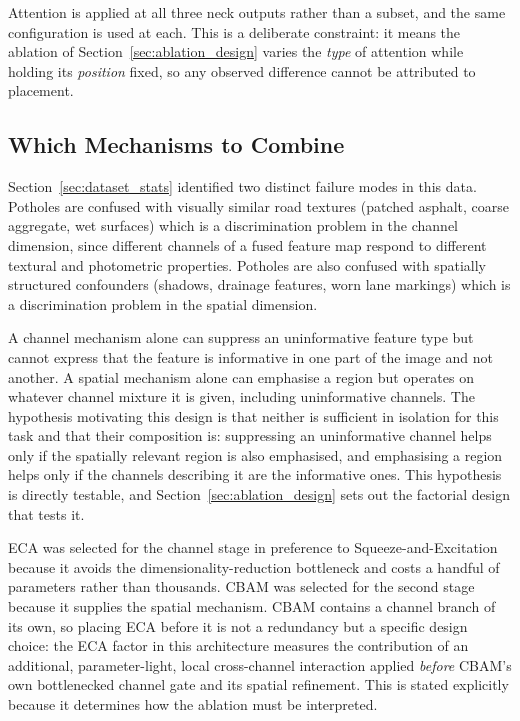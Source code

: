 \documentclass[MScCS]{uccthesis}
\begin{document}
Attention is applied at all three neck outputs rather than a subset, and the
same configuration is used at each. This is a deliberate constraint: it means
the ablation of Section~\ref{sec:ablation_design} varies the \emph{type} of
attention while holding its \emph{position} fixed, so any observed difference
cannot be attributed to placement.

\subsection{Which Mechanisms to Combine}

Section~\ref{sec:dataset_stats} identified two distinct failure modes in this
data. Potholes are confused with visually similar road textures (patched
asphalt, coarse aggregate, wet surfaces) which is a discrimination problem in
the channel dimension, since different channels of a fused feature map respond
to different textural and photometric properties. Potholes are also confused
with spatially structured confounders (shadows, drainage features, worn lane
markings) which is a discrimination problem in the spatial dimension.

A channel mechanism alone can suppress an uninformative feature type but cannot
express that the feature is informative in one part of the image and not
another. A spatial mechanism alone can emphasise a region but operates on
whatever channel mixture it is given, including uninformative channels. The
hypothesis motivating this design is that neither is sufficient in isolation
for this task and that their composition is: suppressing an uninformative
channel helps only if the spatially relevant region is also emphasised, and
emphasising a region helps only if the channels describing it are the
informative ones. This hypothesis is directly testable, and
Section~\ref{sec:ablation_design} sets out the factorial design that tests it.

ECA \parencite{wang2020eca} was selected for the channel stage in preference to
Squeeze-and-Excitation because it avoids the dimensionality-reduction
bottleneck and costs a handful of parameters rather than thousands. CBAM
\parencite{woo2018cbam} was selected for the second stage because it supplies
the spatial mechanism. CBAM contains a channel branch of its own, so placing
ECA before it is not a redundancy but a specific design choice: the ECA factor
in this architecture measures the contribution of an additional,
parameter-light, local cross-channel interaction applied \emph{before} CBAM's
own bottlenecked channel gate and its spatial refinement. This is stated
explicitly because it determines how the ablation must be interpreted.
\end{document}
